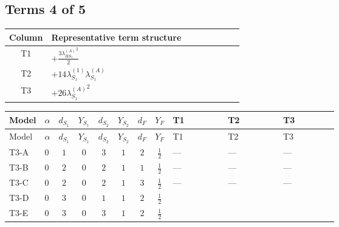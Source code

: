 \documentclass[8pt]{article}
\begin{document}
\begin{landscape}
\subsection*{Terms 4 of 5}
\begin{center}
\begin{tabular}{@{}c >{\raggedright\arraybackslash}p{0.82\linewidth}@{}}
\toprule
Column & Representative term structure \\
\midrule
T1 & \(\displaystyle +\frac{3 {\lambda_{HS_1}^{(A)}}^2}{2}\) \\
\midrule
T2 & \(\displaystyle +14 {\lambda_{S_1}^{(1)}} {\lambda_{S_1}^{(A)}}\) \\
\midrule
T3 & \(\displaystyle +26 {\lambda_{S_1}^{(A)}}^2\) \\
\midrule
\bottomrule
\end{tabular}
\end{center}
\smallskip
\tiny
\begin{longtable}{@{}llcccccc >{\raggedright\arraybackslash}p{0.21\linewidth} >{\raggedright\arraybackslash}p{0.21\linewidth} >{\raggedright\arraybackslash}p{0.21\linewidth}@{}}
\toprule
Model & $\alpha$ & $d_{S_1}$ & $Y_{S_1}$ & $d_{S_2}$ & $Y_{S_2}$ & $d_F$ & $Y_F$ & T1 & T2 & T3 \\
\midrule
\endfirsthead
\toprule
Model & $\alpha$ & $d_{S_1}$ & $Y_{S_1}$ & $d_{S_2}$ & $Y_{S_2}$ & $d_F$ & $Y_F$ & T1 & T2 & T3 \\
\midrule
\endhead
T3-A & $0$ & $1$ & $0$ & $3$ & $1$ & $2$ & $\frac{1}{2}$ & --- & --- & --- \\
\midrule
T3-B & $0$ & $2$ & $0$ & $2$ & $1$ & $1$ & $\frac{1}{2}$ & --- & --- & --- \\
\midrule
T3-C & $0$ & $2$ & $0$ & $2$ & $1$ & $3$ & $\frac{1}{2}$ & --- & --- & --- \\
\midrule
T3-D & $0$ & $3$ & $0$ & $1$ & $1$ & $2$ & $\frac{1}{2}$ & \scriptsize\adjustbox{max width=\linewidth}{$\begin{gathered} +\frac{3 {\lambda_{HS_1}^{(A)}}^2}{2}\end{gathered}$} & \scriptsize\adjustbox{max width=\linewidth}{$\begin{gathered} +14 {\lambda_{S_1}^{(1)}} {\lambda_{S_1}^{(A)}}\end{gathered}$} & \scriptsize\adjustbox{max width=\linewidth}{$\begin{gathered} +26 {\lambda_{S_1}^{(A)}}^2\end{gathered}$} \\
\midrule
T3-E & $0$ & $3$ & $0$ & $3$ & $1$ & $2$ & $\frac{1}{2}$ & \scriptsize\adjustbox{max width=\linewidth}{$\begin{gathered} +\frac{3 {\lambda_{HS_1}^{(A)}}^2}{2}\end{gathered}$} & \scriptsize\adjustbox{max width=\linewidth}{$\begin{gathered} +14 {\lambda_{S_1}^{(1)}} {\lambda_{S_1}^{(A)}}\end{gathered}$} & \scriptsize\adjustbox{max width=\linewidth}{$\begin{gathered} +26 {\lambda_{S_1}^{(A)}}^2\end{gathered}$} \\

\end{longtable}
\end{landscape}
\end{document}
